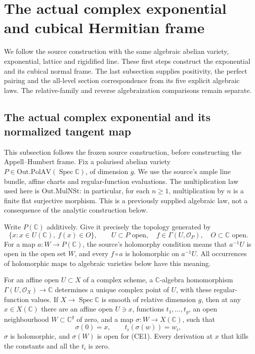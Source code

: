 \section{The actual complex exponential and cubical Hermitian frame}
\label{sec:faithful-complex-realisation}
We follow the source construction with the same algebraic abelian
variety, exponential, lattice and rigidified line. These first
steps construct the exponential and its cubical normal frame.
The last subsection supplies positivity, the perfect pairing and the
all-level section correspondence from its five explicit algebraic laws.
The relative-family and reverse algebraization comparisons remain separate.


\subsection{The actual complex exponential and its normalized tangent map}
\label{subsec:ftb-actual-complex-exponential}

This subsection follows the frozen source construction, before constructing the
Appell--Humbert frame.  Fix a polarised abelian variety
\(P\in\mathrm{Out.PolAV}(\operatorname{Spec}\mathbb C)\), of dimension \(g\).
We use the source's ample line bundle, affine charts and regular-function
evaluations.  The multiplication law used here is
\(\mathrm{Out.MulNSt}\): in particular, for each \(n\geq1\), multiplication
by \(n\) is a finite flat surjective morphism.  This is a previously supplied
algebraic law, not a consequence of the analytic construction below.

Write \(P(\mathbb C)\) additively.  Give it precisely the topology generated by
\[
 \{x:x\in U(\mathbb C),\ f(x)\in O\},
 \qquad U\subset P\text{ open},\quad f\in\Gamma(U,\mathcal O_P),
 \quad O\subset\mathbb C\text{ open}.                         \tag{CE1}
\]
For a map \(a:W\to P(\mathbb C)\), the source's holomorphy condition means that
\(a^{-1}U\) is open in the open set \(W\), and every
\(f\circ a\) is holomorphic on \(a^{-1}U\).  All occurrences of
holomorphic maps to algebraic varieties below have this meaning.

\begin{srlemma}
\label{lem:ftb-complex-algebraic-charts}
For an affine open \(U\subset X\) of a complex scheme, a
\(\mathbb C\)-algebra homomorphism
\(\Gamma(U,\mathcal O_X)\to\mathbb C\) determines a unique complex point of
\(U\), with these regular-function values.  If \(X\to\operatorname{Spec}\mathbb C\)
is smooth of relative dimension \(g\), then at any \(x\in X(\mathbb C)\)
there are an affine open \(U\ni x\), functions \(t_1,\ldots,t_g\), an open
neighbourhood \(W\subset\mathbb C^g\) of zero, and a map
\(\sigma:W\to X(\mathbb C)\), such that
\[
 \sigma(0)=x,\qquad t_i(\sigma(w))=w_i,                       \tag{CE2}
\]
\(\sigma\) is holomorphic, and \(\sigma(W)\) is open for (CE1).
Every derivation at \(x\) that kills the constants and all the \(t_i\)
is zero.
\end{srlemma}

